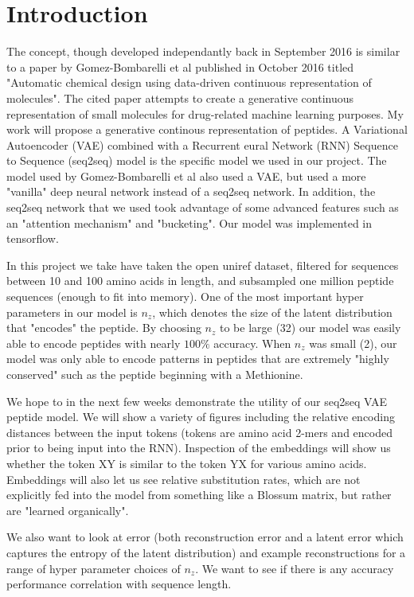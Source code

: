\documentclass[preprint,12pt]{elsarticle}
\begin{document}
\linenumbers

\section{Introduction}

The concept, though developed independantly back in September 2016 is similar to a paper by Gomez-Bombarelli et al published in October 2016 titled "Automatic chemical design using data-driven continuous representation of molecules"\cite{gomez2016automatic}. The cited paper attempts to create a generative continuous representation of small molecules for drug-related machine learning purposes. My work will propose a generative continous representation of peptides. A Variational Autoencoder (VAE) combined with a Recurrent eural Network (RNN) Sequence to Sequence (seq2seq) model is the specific model we used in our project. The model used by Gomez-Bombarelli et al also used a VAE, but used a more "vanilla" deep neural network instead of a seq2seq network. In addition, the seq2seq network that we used took advantage of some advanced features such as an "attention mechanism" and "bucketing". Our model was implemented in tensorflow.

In this project we take have taken the open uniref dataset, filtered for sequences between 10 and 100 amino acids in length, and subsampled one million peptide sequences (enough to fit into memory). One of the most important hyper parameters in our model is $n_z$, which denotes the size of the latent distribution that "encodes" the peptide. By choosing $n_z$ to be large (32) our model was easily able to encode peptides with nearly $100\%$ accuracy. When $n_z$ was small (2), our model was only able to encode patterns in peptides that are extremely "highly conserved" such as the peptide beginning with a Methionine.

We hope to in the next few weeks demonstrate the utility of our seq2seq VAE peptide model. We will show a variety of figures including the relative encoding distances between the input tokens (tokens are amino acid 2-mers and encoded prior to being input into the RNN). Inspection of the embeddings will show us whether the token XY is similar to the token YX for various amino acids. Embeddings will also let us see relative substitution rates, which are not explicitly fed into the model from something like a Blossum matrix, but rather are "learned organically".

We also want to look at error (both reconstruction error and a latent error which captures the entropy of the latent distribution) and example reconstructions for a range of hyper parameter choices of $n_z$. We want to see if there is any accuracy performance correlation with sequence length.
\end{document}

